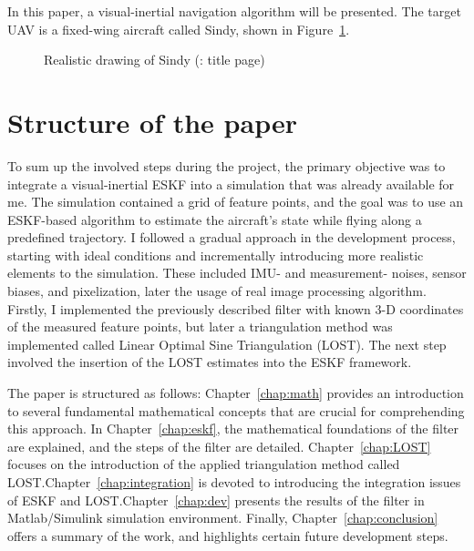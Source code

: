 In this paper, a visual-inertial navigation algorithm will be presented. The target UAV is a fixed-wing aircraft called Sindy, shown in Figure~\ref{fig:sindy}.
\begin{figure}[!ht]
    \centering
    
    \caption{Realistic drawing of Sindy (\cite{sindy-manual}: title page)}\label{fig:sindy}
\end{figure}

\section{Structure of the paper}

To sum up the involved steps during the project, the primary objective was to integrate a visual-inertial ESKF into a simulation that was already available for me. The simulation contained a grid of feature points, and the goal was to use an ESKF-based algorithm to estimate the aircraft's state while flying along a predefined trajectory. I followed a gradual approach in the development process, starting with ideal conditions and incrementally introducing more realistic elements to the simulation. These included IMU- and measurement- noises, sensor biases, and pixelization, later the usage of real image processing algorithm. Firstly, I implemented the previously described filter with known 3-D coordinates of the measured feature points, but later a triangulation method was implemented called Linear Optimal Sine Triangulation (LOST). The next step involved the insertion of the LOST estimates into the ESKF framework. 

The paper is structured as follows: Chapter~\ref{chap:math} provides an introduction to several fundamental mathematical concepts that are crucial for comprehending this approach. In Chapter~\ref{chap:eskf}, the mathematical foundations of the filter are explained, and the steps of the filter are detailed. Chapter~\ref{chap:LOST} focuses on the introduction of the applied triangulation method called LOST.\@ Chapter~\ref{chap:integration} is devoted to introducing the integration issues of ESKF and LOST.\@ Chapter~\ref{chap:dev} presents the results of the filter in Matlab/Simulink simulation environment. Finally, Chapter~\ref{chap:conclusion} offers a summary of the work, and highlights certain future development steps.